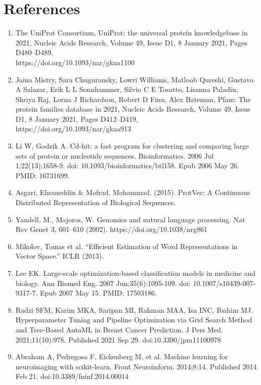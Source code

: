 \documentclass[12pt]{article}
\begin{document}
\section*{References}
\begin{footnotesize}
\begin{enumerate}
\item The UniProt Consortium, UniProt: the universal protein knowledgebase in 2021, Nucleic Acids Research, Volume 49, Issue D1, 8 January 2021, Pages D480–D489, \\ https://doi.org/10.1093/nar/gkaa1100
\item Jaina Mistry, Sara Chuguransky, Lowri Williams, Matloob Qureshi, Gustavo A Salazar, Erik L L Sonnhammer, Silvio C E Tosatto, Lisanna Paladin, Shriya Raj, Lorna J Richardson, Robert D Finn, Alex Bateman, Pfam: The protein families database in 2021, Nucleic Acids Research, Volume 49, Issue D1, 8 January 2021, Pages D412–D419, \\ https://doi.org/10.1093/nar/gkaa913
\item Li W, Godzik A. Cd-hit: a fast program for clustering and comparing large sets of protein or nucleotide sequences. Bioinformatics. 2006 Jul 1;22(13):1658-9. doi: 10.1093/bioinformatics/btl158. Epub 2006 May 26. PMID: 16731699.
\item Asgari, Ehsaneddin \& Mofrad, Mohammad. (2015). ProtVec: A Continuous Distributed Representation of Biological Sequences. 
\item Yandell, M., Majoros, W. Genomics and natural language processing. Nat Rev Genet 3, 601–610 (2002). https://doi.org/10.1038/nrg861
\item Mikolov, Tomas et al. “Efficient Estimation of Word Representations in Vector Space.” ICLR (2013).
\item Lee EK. Large-scale optimization-based classification models in medicine and biology. Ann Biomed Eng. 2007 Jun;35(6):1095-109. doi: 10.1007/s10439-007-9317-7. Epub 2007 May 15. PMID: 17503186.
\item Radzi SFM, Karim MKA, Saripan MI, Rahman MAA, Isa INC, Ibahim MJ. Hyperparameter Tuning and Pipeline Optimization via Grid Search Method and Tree-Based AutoML in Breast Cancer Prediction. J Pers Med. 2021;11(10):978. Published 2021 Sep 29. doi:10.3390/jpm11100978
\item Abraham A, Pedregosa F, Eickenberg M, et al. Machine learning for neuroimaging with scikit-learn. Front Neuroinform. 2014;8:14. Published 2014 Feb 21. doi:10.3389/fninf.2014.00014
\end{enumerate}
\end{footnotesize}
\newpage
\end{document}
